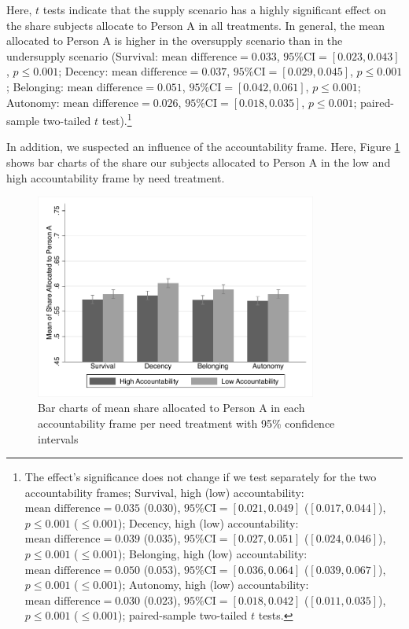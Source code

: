 \documentclass[egregdoesnotlikesansseriftitles]{scrartcl}
\begin{document}
Here, $t$ tests indicate that the supply scenario has a highly significant effect on the share subjects allocate to Person A in all treatments.
In general, the mean allocated to Person A is higher in the oversupply scenario than in the undersupply scenario (Survival: $\text{mean difference}=0.033$, $\text{95\% CI}=[0.023,0.043]$, $p\le0.001$; Decency: $\text{mean difference}=0.037$, $\text{95\% CI}=[0.029,0.045]$, $p\le0.001$; Belonging: $\text{mean difference}=0.051$, $\text{95\% CI}=[0.042,0.061]$, $p\le0.001$; Autonomy: $\text{mean difference}=0.026$, $\text{95\% CI}=[0.018,0.035]$, $p\le0.001$; paired-sample two-tailed $t$ test).\footnote{The effect's significance does not change if we test separately for the two accountability frames; Survival, high (low) accountability: $\text{mean difference}=0.035$ ($0.030$), $\text{95\% CI}=[0.021,0.049]$ ($[0.017,0.044]$), $p\le0.001$ ($\le0.001$); Decency, high (low) accountability: $\text{mean difference}=0.039$ ($0.035$), $\text{95\% CI}=[0.027,0.051]$ ($[0.024,0.046]$), $p\le0.001$ ($\le0.001$); Belonging, high (low) accountability: $\text{mean difference}=0.050$ ($0.053$), $\text{95\% CI}=[0.036,0.064]$ ($[0.039,0.067]$), $p\le0.001$ ($\le0.001$); Autonomy, high (low) accountability: $\text{mean difference}=0.030$ ($0.023$), $\text{95\% CI}=[0.018,0.042]$ ($[0.011,0.035]$), $p\le0.001$ ($\le0.001$); paired-sample two-tailed $t$ tests.}

In addition, we suspected an influence of the accountability frame.
Here, Figure \ref{fig:figure_4} shows bar charts of the share our subjects allocated to Person A in the low and high accountability frame by need treatment.

\begin{figure}[ht]
   \centering
   \includegraphics[width=25em]{figures/figure_4.pdf}
   \caption{Bar charts of mean share allocated to Person A in each accountability frame per need treatment with 95\% confidence intervals}
   \label{fig:figure_4}
\end{figure}
\end{document}
